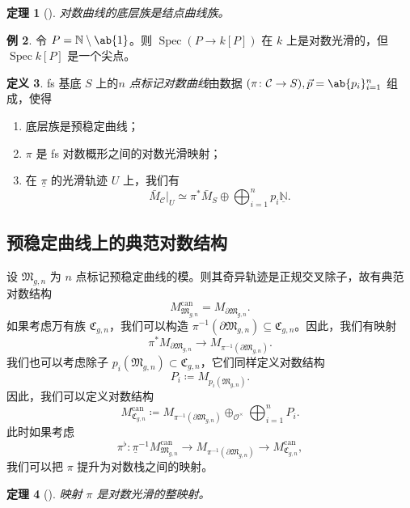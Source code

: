 \documentclass{amsart}
\newtheorem{thm}{定理}[section]
\theoremstyle{definition}
\newtheorem{defn}[thm]{定义}
\newtheorem{exm}[thm]{例}
\theoremstyle{remark}
\theoremstyle{plain}
\theoremstyle{definition}
\theoremstyle{remark}
\newcommand{\N}{\mathbb{N}}
\newcommand{\mc}[1]{\mathcal{#1}}
\newcommand{\mf}[1]{\mathfrak{#1}}
\newcommand{\on}[1]{\operatorname{#1}}
\newcommand{\ul}[1]{\underline{#1}}
\newcommand{\1}{\mathbf{1}}
\newcommand{\2}{\mathbf{2}}
\newcommand{\3}{\mathbf{3}}
\DeclareMathOperator{\Spec}{Spec}
\begin{document}
\begin{thm}[{\cite{FKato2000}}]
    对数曲线的底层族是结点曲线族。
\end{thm}

\begin{exm}
    令 \(P = \N \setminus \ab\{1\}\)。则 \(\Spec (P \to k[P])\) 在 \(k\) 上是对数光滑的，但 \(\Spec k[P]\) 是一个尖点。
\end{exm}

\begin{defn}
    fs 基底 \(S\) 上的\textit{\(n\) 点标记对数曲线}由数据 \((\pi \colon \mc{C} \to S), \vec{p} = \ab\{p_i\}_{i=1}^n\) 组成，使得
    \begin{enumerate}
        \item 底层族是预稳定曲线；
        \item \(\pi\) 是 fs 对数概形之间的对数光滑映射；
        \item 在 \(\ul{\pi}\) 的光滑轨迹 \(U\) 上，我们有
            \[ \bar{M}_{\mc{C}}|_U \simeq \pi^* \bar{M}_S \oplus \bigoplus_{i=1}^n p_i \ul{\N}. \]
    \end{enumerate}
\end{defn}

\subsection{预稳定曲线上的典范对数结构}%
\label{sub:Canonical log structures on prestable curves}

设 \(\mf{M}_{g,n}\) 为 \(n\) 点标记预稳定曲线的模。则其奇异轨迹是正规交叉除子，故有典范对数结构
\[ M_{\mf{M}_{g,n}}^{\on{can}} = M_{\partial \mf{M}_{g,n}}. \]
如果考虑万有族 \(\mf{C}_{g,n}\)，我们可以构造 \(\pi^{-1}(\partial \mf{M}_{g,n}) \subseteq \mf{C}_{g,n}\)。因此，我们有映射
\[ \pi^* M_{\partial \mf{M}_{g,n}} \to M_{\pi^{-1}(\partial \mf{M}_{g,n})}. \]
我们也可以考虑除子 \(p_i(\mf{M}_{g,n}) \subset \mf{C}_{g,n}\)，它们同样定义对数结构
\[ P_i \coloneqq M_{p_i(\mf{M}_{g,n})}. \]
因此，我们可以定义对数结构
\[ M_{\mf{C}_{g,n}}^{\on{can}} \coloneqq M_{\pi^{-1}(\partial\mf{M}_{g,n})} \oplus_{\mc{O}^{\times}} \bigoplus_{i=1}^n P_i. \]
此时如果考虑
\[ \pi^{\flat} \colon \ul{\pi}^{-1} M_{\mf{M}_{g,n}}^{\on{can}} \to M_{\pi^{-1}(\partial \mf{M}_{g,n})} \to M_{\mf{C}_{g,n}}^{\on{can}}, \]
我们可以把 \(\pi\) 提升为对数栈之间的映射。

\begin{thm}[{\cite{FKato2000}}]
    映射 \(\pi\) 是对数光滑的整映射。
\end{thm}
\end{document}

